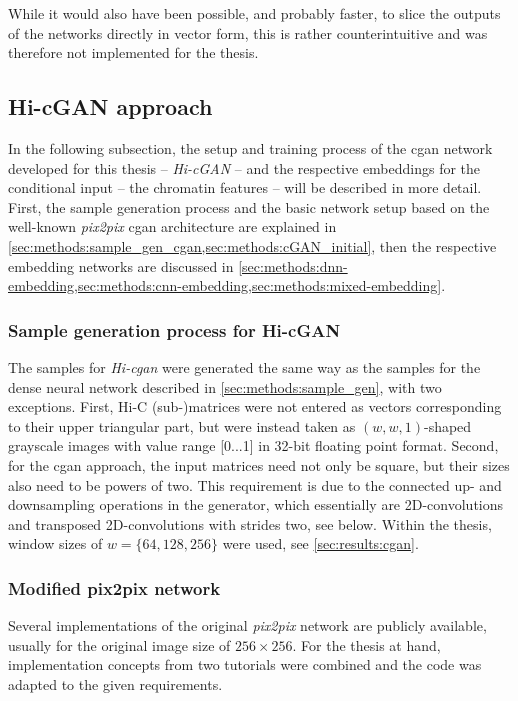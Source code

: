 While it would also have been possible, and probably faster, to slice the outputs of the networks directly in vector form, 
this is rather counterintuitive and was therefore not implemented for the thesis. 
\clearpage 

\subsection{Hi-cGAN approach} \label{sec:methods:hicgan}
In the following subsection, the setup and training process of the \acrshort{cgan} network developed for this thesis -- \emph{Hi-cGAN} -- and the respective
embeddings for the conditional input -- the chromatin features -- will be described in more detail.
First, the sample generation process and the basic network setup based on the well-known \emph{pix2pix} \acrshort{cgan} architecture \cite{Isola2017} 
are explained in \cref{sec:methods:sample_gen_cgan,sec:methods:cGAN_initial}, 
then the respective embedding networks are discussed in \cref{sec:methods:dnn-embedding,sec:methods:cnn-embedding,sec:methods:mixed-embedding}.

\subsubsection{Sample generation process for Hi-cGAN} \label{sec:methods:sample_gen_cgan}
The samples for \emph{Hi-\acrshort{cgan}} were generated the same way as the samples for the dense neural network described 
in \cref{sec:methods:sample_gen}, with two exceptions.
First, Hi-C (sub-)matrices were not entered as vectors corresponding to their upper triangular part, 
but were instead taken as $(w, w, 1)$-shaped grayscale images with value range [0...1] in 32-bit floating point format.
Second, for the \acrshort{cgan} approach, the input matrices need not only be square,
but their sizes also need to be powers of two. 
This requirement is due to the connected up- and downsampling operations in the generator, 
which essentially are 2D-convolutions and transposed 2D-convolutions with strides two, see below.
Within the thesis, window sizes of $w=\{64,128,256\}$ were used, see \cref{sec:results:cgan}.

\subsubsection{Modified pix2pix network}\label{sec:methods:cGAN_initial}
Several implementations of the original \emph{pix2pix} network \cite{Isola2017} are publicly available, usually for the original image size of $256\times256$.
For the thesis at hand, implementation concepts from two tutorials \cite{tfpix2pix2020, brownlee2019} were combined and the code was adapted to the given requirements.

